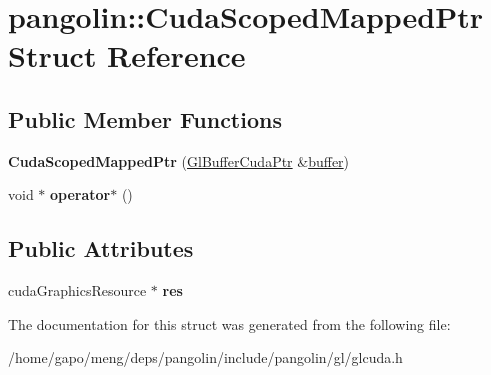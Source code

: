 \hypertarget{structpangolin_1_1_cuda_scoped_mapped_ptr}{}\section{pangolin\+:\+:Cuda\+Scoped\+Mapped\+Ptr Struct Reference}
\label{structpangolin_1_1_cuda_scoped_mapped_ptr}
\subsection*{Public Member Functions}
\begin{DoxyCompactItemize}
\item 
{\bfseries Cuda\+Scoped\+Mapped\+Ptr} (\hyperlink{structpangolin_1_1_gl_buffer_cuda_ptr}{Gl\+Buffer\+Cuda\+Ptr} \&\hyperlink{structpangolin_1_1buffer}{buffer})\hypertarget{structpangolin_1_1_cuda_scoped_mapped_ptr_ad79e228449c3e70fe2142098f6963749}{}\label{structpangolin_1_1_cuda_scoped_mapped_ptr_ad79e228449c3e70fe2142098f6963749}

\item 
void $\ast$ {\bfseries operator$\ast$} ()\hypertarget{structpangolin_1_1_cuda_scoped_mapped_ptr_a42b1c4536e3ad0d9e58631879ade5f60}{}\label{structpangolin_1_1_cuda_scoped_mapped_ptr_a42b1c4536e3ad0d9e58631879ade5f60}

\end{DoxyCompactItemize}
\subsection*{Public Attributes}
\begin{DoxyCompactItemize}
\item 
cuda\+Graphics\+Resource $\ast$ {\bfseries res}\hypertarget{structpangolin_1_1_cuda_scoped_mapped_ptr_a964c6366fdffe0430b3f41b9c1b31504}{}\label{structpangolin_1_1_cuda_scoped_mapped_ptr_a964c6366fdffe0430b3f41b9c1b31504}

\end{DoxyCompactItemize}


The documentation for this struct was generated from the following file\+:\begin{DoxyCompactItemize}
\item 
/home/gapo/meng/deps/pangolin/include/pangolin/gl/glcuda.\+h\end{DoxyCompactItemize}
